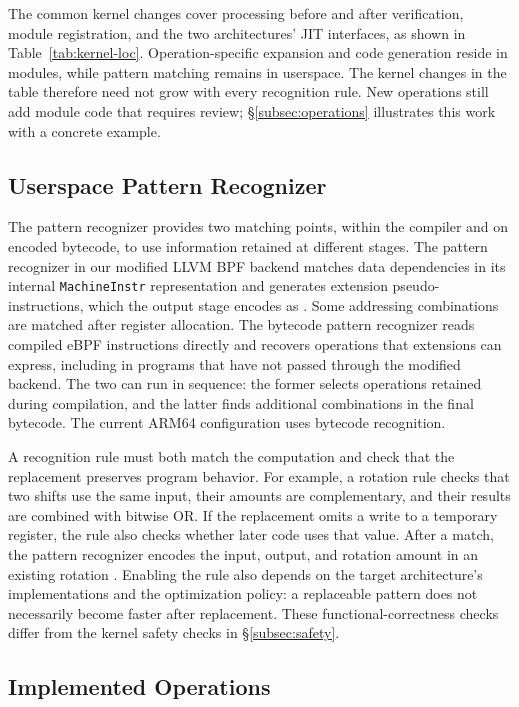The common kernel changes cover processing before and after verification, module registration, and the two architectures' JIT interfaces, as shown in Table~\ref{tab:kernel-loc}. Operation-specific expansion and code generation reside in modules, while pattern matching remains in userspace. The kernel changes in the table therefore need not grow with every recognition rule. New operations still add module code that requires review; \S\ref{subsec:operations} illustrates this work with a concrete example.



\subsection{Userspace Pattern Recognizer}
\label{subsec:llvm}

The pattern recognizer provides two matching points, within the compiler and on encoded bytecode, to use information retained at different stages. The pattern recognizer in our modified LLVM BPF backend matches data dependencies in its internal \texttt{MachineInstr} representation and generates extension pseudo-instructions, which the output stage encodes as \kinsns. Some addressing combinations are matched after register allocation. The bytecode pattern recognizer reads compiled eBPF instructions directly and recovers operations that extensions can express, including in programs that have not passed through the modified backend. The two can run in sequence: the former selects operations retained during compilation, and the latter finds additional combinations in the final bytecode. The current ARM64 configuration uses bytecode recognition.

A recognition rule must both match the computation and check that the replacement preserves program behavior. For example, a rotation rule checks that two shifts use the same input, their amounts are complementary, and their results are combined with bitwise OR. If the replacement omits a write to a temporary register, the rule also checks whether later code uses that value. After a match, the pattern recognizer encodes the input, output, and rotation amount in an existing rotation \kinsn. Enabling the rule also depends on the target architecture's implementations and the optimization policy: a replaceable pattern does not necessarily become faster after replacement. These functional-correctness checks differ from the kernel safety checks in \S\ref{subsec:safety}.

\subsection{Implemented Operations}
\label{subsec:descriptors}
\label{subsec:operations}
\label{sec:lang}
\label{subsec:adding}

